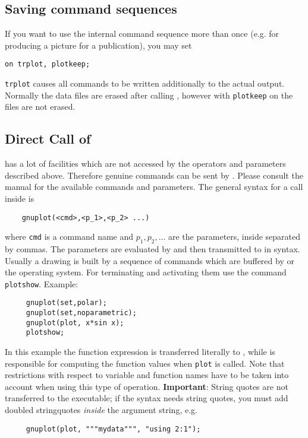 \subsection{Saving {\Gnuplot} command sequences}

If you want to use the internal {\Gnuplot} command sequence more than once
(e.g. for producing a picture for a publication), you may set
\begin{verbatim}
on trplot, plotkeep;
\end{verbatim}
\texttt{trplot} causes all {\Gnuplot} commands to be written additionally to the
actual {\REDUCE} output.  Normally the data files are erased after calling
{\Gnuplot}, however with \texttt{plotkeep} on the files are not erased.


\subsection{Direct Call of {\Gnuplot}}

{\Gnuplot} has a lot of facilities which are not accessed by the operators and
parameters described above. Therefore genuine {\Gnuplot} commands can be sent by
{\REDUCE}.  Please consult the {\Gnuplot} manual for the available commands and
parameters. The general syntax for a {\Gnuplot} call inside {\REDUCE} is
\begin{verbatim}
    gnuplot(<cmd>,<p_1>,<p_2> ...)
\end{verbatim}
where \texttt{cmd} is a command name and $p_1,p_2, \ldots$ are the parameters,
inside {\REDUCE} separated by commas. The parameters are evaluated by {\REDUCE}
and then transmitted to {\Gnuplot} in {\Gnuplot} syntax. Usually a drawing is built by
a sequence of commands which are buffered by {\REDUCE} or the operating
system. For terminating and activating them use the {\REDUCE}
command \texttt{plotshow}.  Example:
\begin{verbatim}
     gnuplot(set,polar);
     gnuplot(set,noparametric);
     gnuplot(plot, x*sin x);
     plotshow;
\end{verbatim}
In this example the function expression is transferred literally to {\Gnuplot},
while {\REDUCE} is responsible for computing the function values
when \texttt{plot} is called.  Note that {\Gnuplot} restrictions with respect to
variable and function names have to be taken into account when using this type
of operation. \textbf{Important}: String quotes are not transferred to the {\Gnuplot}
executable; if the {\Gnuplot} syntax needs string quotes, you must add doubled
stringquotes \emph{inside} the argument string, e.g.
\begin{verbatim}
     gnuplot(plot, """mydata""", "using 2:1");
\end{verbatim}


